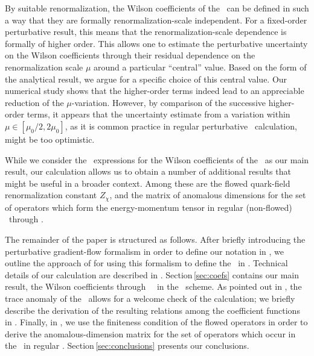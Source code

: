 By suitable renormalization, the Wilson coefficients of the \emt\ can be
defined in such a way that they are formally renormalization-scale
independent. For a fixed-order perturbative result, this means that the
renormalization-scale dependence is formally of higher order. This
allows one to estimate the perturbative uncertainty on the Wilson
coefficients through their residual dependence on the renormalization
scale $\mu$ around a particular ``central'' value. Based on the form of
the analytical result, we argue for a specific choice of this central
value. Our numerical study shows that the higher-order terms indeed lead
to an appreciable reduction of the $\mu$-variation. However, by
comparison of the successive higher-order terms, it appears that the
uncertainty estimate from a variation within $\mu\in[\mu_0/2,2\mu_0]$,
as it is common practice in regular perturbative \qcd\ calculation,
might be too optimistic.

While we consider the \nnlo\ expressions for the Wilson coefficients of
the \emt\ as our main result, our calculation allows us to obtain a
number of additional results that might be useful in a broader
context. Among these are the flowed quark-field renormalization constant
$Z_\chi$, and the matrix of anomalous dimensions for the set of
operators which form the energy-momentum tensor in regular (non-flowed)
\qcd\ through \nnlo.

The remainder of the paper is structured as follows. After briefly
introducing the perturbative gradient-flow formalism in order to define
our notation in , we outline the approach of
 for using this formalism to
define the \emt\ in . Technical details of our calculation
are described in . Section\,\ref{sec:coefs} contains our
main result, the Wilson coefficients through \nnlo\ \qcd\ in the
\msbar\ scheme. As pointed out in , the trace
anomaly of the \emt\ allows for a welcome check of the calculation; we
briefly describe the derivation of the resulting relations among the
coefficient functions in . Finally, in , we
use the finiteness condition of the flowed operators in order to derive
the anomalous-dimension matrix for the set of operators which occur in
the \emt\ in regular \qcd. Section\,\ref{sec:conclusions} presents our
conclusions.
